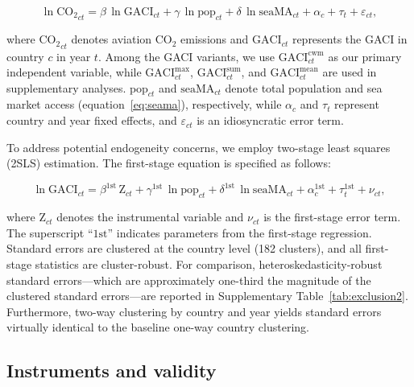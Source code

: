 \documentclass[12pt]{extarticle}
\begin{document}
\begin{equation}
\ln \mathrm{CO_2}_{ct} = \beta \,\ln \mathrm{GACI}_{ct}
 + \gamma \,\ln \mathrm{pop}_{ct} + \delta \,\ln \mathrm{seaMA}_{ct}
 + \alpha_c + \tau_t + \varepsilon_{ct},
\label{eq:main}
\end{equation}

where $\mathrm{CO_2}_{ct}$ denotes aviation CO$_2$ emissions and $\mathrm{GACI}_{ct}$ represents the GACI in country $c$ in year $t$. Among the GACI variants, we use $\mathrm{GACI}^{\mathrm{cwm}}_{ct}$ as our primary independent variable, while $\mathrm{GACI}^{\mathrm{max}}_{ct}$, $\mathrm{GACI}^{\mathrm{sum}}_{ct}$, and $\mathrm{GACI}^{\mathrm{mean}}_{ct}$ are used in supplementary analyses. $\mathrm{pop}_{ct}$ and $\mathrm{seaMA}_{ct}$ denote total population and sea market access (equation~\ref{eq:seama}), respectively, while $\alpha_c$ and $\tau_t$ represent country and year fixed effects, and $\varepsilon_{ct}$ is an idiosyncratic error term.

To address potential endogeneity concerns, we employ two-stage least squares (2SLS) estimation. The first-stage equation is specified as follows:

\begin{equation}
\ln \mathrm{GACI}_{ct} = \beta^{\mathrm{1st}} \,\mathrm{Z}_{ct}
 + \gamma^{\mathrm{1st}} \,\ln \mathrm{pop}_{ct} + \delta^{\mathrm{1st}} \,\ln \mathrm{seaMA}_{ct}
 + \alpha_c^{\mathrm{1st}} + \tau_t^{\mathrm{1st}} + \nu_{ct},
\label{eq:firststage}
\end{equation}

where $\mathrm{Z}_{ct}$ denotes the instrumental variable and $\nu_{ct}$ is the first-stage error term. The superscript ``$\mathrm{1st}$'' indicates parameters from the first-stage regression. Standard errors are clustered at the country level (182 clusters), and all first-stage statistics are cluster-robust. For comparison, heteroskedasticity-robust standard errors---which are approximately one-third the magnitude of the clustered standard errors---are reported in Supplementary Table~\ref{tab:exclusion2}. Furthermore, two-way clustering by country and year yields standard errors virtually identical to the baseline one-way country clustering.


\subsection*{Instruments and validity}
\end{document}
